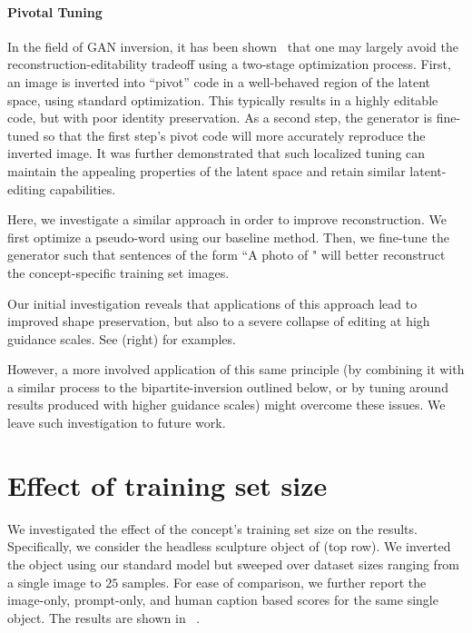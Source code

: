 \paragraph{Pivotal Tuning}
In the field of GAN inversion, it has been shown~\citep{roich2021pivotal,semantic2019bau} that one may largely avoid the reconstruction-editability tradeoff using a two-stage optimization process. First, an image is inverted into ``pivot'' code in a well-behaved region of the latent space, using standard optimization. This typically results in a highly editable code, but with poor identity preservation. As a second step, the generator is fine-tuned so that the first step's pivot code will more accurately reproduce the inverted image. It was further demonstrated that such localized tuning can maintain the appealing properties of the latent space and retain similar latent-editing capabilities.

Here, we investigate a similar approach in order to improve reconstruction. We first optimize a pseudo-word using our baseline method. Then, we fine-tune the generator such that sentences of the form ``A photo of \pholdercolor" will better reconstruct the concept-specific training set images.

Our initial investigation reveals that \naive applications of this approach lead to improved shape preservation, but also to a severe collapse of editing at high guidance scales. See  (right) for examples.

However, a more involved application of this same principle (\eg by combining it with a similar process to the bipartite-inversion outlined below, or by tuning around results produced with higher guidance scales) might overcome these issues. We leave such investigation to future work. 
\clearpage



\section{Effect of training set size}

We investigated the effect of the concept's training set size on the results. Specifically, we consider the headless sculpture object of  (top row). We inverted the object using our standard model but sweeped over dataset sizes ranging from a single image to $25$ samples. For ease of comparison, we further report the image-only, prompt-only, and human caption based scores for the same single object. The results are shown in ~.

